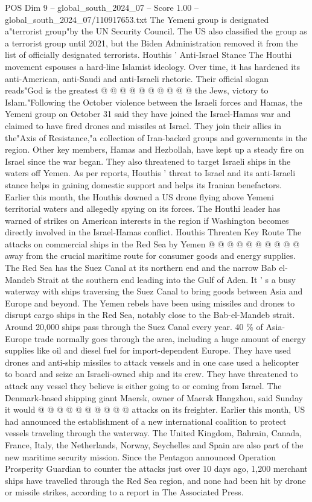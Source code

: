 \begin{textsample}{POS Dim 9 – global\_south\_2024\_07 – Score 1.00 – global\_south\_2024\_07/110917653.txt}
The Yemeni group is designated a"terrorist group"by the UN Security Council.
The US also classified the group as a terrorist group until 2021, but the Biden Administration removed it from the list of officially designated terrorists.
Houthis ' Anti-Israel Stance The Houthi movement espouses a hard-line Islamist ideology.
Over time, it has hardened its anti-American, anti-Saudi and anti-Israeli rhetoric.
Their official slogan reads"God is the greatest @ @ @ @ @ @ @ @ @ @ the Jews, victory to Islam."Following the October violence between the Israeli forces and Hamas, the Yemeni group on October 31 said they have joined the Israel-Hamas war and claimed to have fired drones and missiles at Israel.
They join their allies in the"Axis of Resistance,"a collection of Iran-backed groups and governments in the region.
Other key members, Hamas and Hezbollah, have kept up a steady fire on Israel since the war began.
They also threatened to target Israeli ships in the waters off Yemen.
As per reports, Houthis ' threat to Israel and its anti-Israeli stance helps in gaining domestic support and helps its Iranian benefactors.
Earlier this month, the Houthis downed a US drone flying above Yemeni territorial waters and allegedly spying on its forces.
The Houthi leader has warned of strikes on American interests in the region if Washington becomes directly involved in the Israel-Hamas conflict.
Houthis Threaten Key Route The attacks on commercial ships in the Red Sea by Yemen @ @ @ @ @ @ @ @ @ @ away from the crucial maritime route for consumer goods and energy supplies.
The Red Sea has the Suez Canal at its northern end and the narrow Bab el-Mandeb Strait at the southern end leading into the Gulf of Aden.
It ' s a busy waterway with ships traversing the Suez Canal to bring goods between Asia and Europe and beyond.
The Yemen rebels have been using missiles and drones to disrupt cargo ships in the Red Sea, notably close to the Bab-el-Mandeb strait.
Around 20,000 ships pass through the Suez Canal every year. 40 \% of Asia-Europe trade normally goes through the area, including a huge amount of energy supplies like oil and diesel fuel for import-dependent Europe.
They have used drones and anti-ship missiles to attack vessels and in one case used a helicopter to board and seize an Israeli-owned ship and its crew.
They have threatened to attack any vessel they believe is either going to or coming from Israel.
The Denmark-based shipping giant Maersk, owner of Maersk Hangzhou, said Sunday it would @ @ @ @ @ @ @ @ @ @ attacks on its freighter.
Earlier this month, US had announced the establishment of a new international coalition to protect vessels traveling through the waterway.
The United Kingdom, Bahrain, Canada, France, Italy, the Netherlands, Norway, Seychelles and Spain are also part of the new maritime security mission.
Since the Pentagon announced Operation Prosperity Guardian to counter the attacks just over 10 days ago, 1,200 merchant ships have travelled through the Red Sea region, and none had been hit by drone or missile strikes, according to a report in The Associated Press.

\end{textsample}
